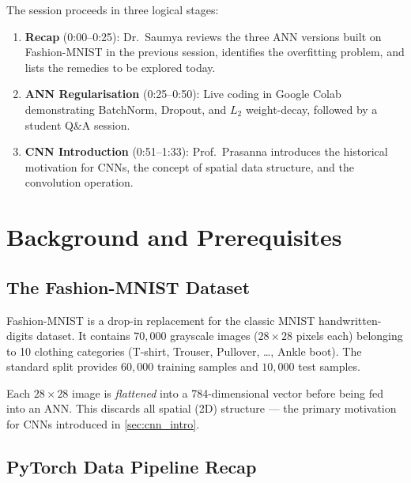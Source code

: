 \documentclass[12pt,a4paper]{article}
\newcommand{\Ltwo}{L_2}
\begin{document}
The session proceeds in three logical stages:

\begin{enumerate}
  \item \textbf{Recap} (0:00--0:25): Dr.\ Saumya reviews the three ANN
        versions built on Fashion-MNIST in the previous session, identifies
        the overfitting problem, and lists the remedies to be explored today.
  \item \textbf{ANN Regularisation} (0:25--0:50): Live coding in Google Colab
        demonstrating BatchNorm, Dropout, and $\Ltwo$ weight-decay,
        followed by a student Q\&A session.
  \item \textbf{CNN Introduction} (0:51--1:33): Prof.\ Prasanna introduces
        the historical motivation for CNNs, the concept of spatial
        data structure, and the convolution operation.
\end{enumerate}

\section{Background and Prerequisites}
\label{sec:background}

\subsection{The Fashion-MNIST Dataset}
\label{sec:background:fashionmnist}

Fashion-MNIST \cite{xiao2017fashionmnist} is a drop-in replacement for the
classic MNIST handwritten-digits dataset.  It contains $70{,}000$ grayscale
images ($28\times28$ pixels each) belonging to 10 clothing categories
(T-shirt, Trouser, Pullover, \ldots, Ankle boot).  The standard split
provides $60{,}000$ training samples and $10{,}000$ test samples.

\begin{keyinsight}
  Each $28\times28$ image is \emph{flattened} into a 784-dimensional vector
  before being fed into an ANN.  This discards all spatial (2D) structure ---
  the primary motivation for CNNs introduced in \cref{sec:cnn_intro}.
\end{keyinsight}

\subsection{PyTorch Data Pipeline Recap}
\label{sec:background:pipeline}
\end{document}
